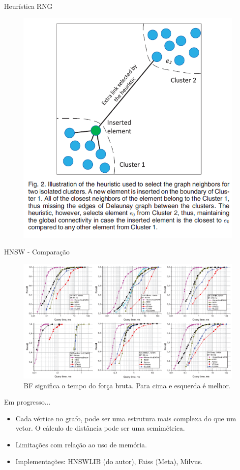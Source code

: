 \documentclass[11pt]{beamer}
\begin{document}
\begin{frame}{Heurística RNG}
    \begin{figure}
        \centering
        \includegraphics[width=0.5\linewidth]{imgs/hnsw_heuristic.png}
    \end{figure}
\end{frame}

\begin{frame}{HNSW - Comparação}
    \begin{figure}
        \centering
        \includegraphics[width=0.85\linewidth]{imgs/hnsw_results.png}
        \caption{\scriptsize BF significa o tempo do força bruta. Para cima e esquerda é melhor.}
    \end{figure}
\end{frame}

\begin{frame}{Em progresso...}
    \begin{itemize}
        \item Cada vértice no grafo, pode ser uma estrutura mais complexa do que um vetor. O cálculo de distância pode ser uma semimétrica.
        \item Limitações com relação ao uso de memória.
        \item Implementações: HNSWLIB (do autor), Faiss (Meta), Milvus.
    \end{itemize}
\end{frame}
\end{document}
